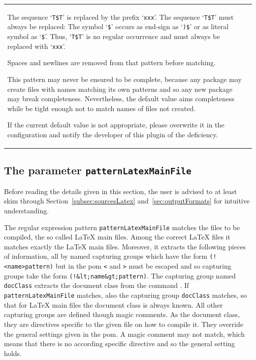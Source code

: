 \begin{longtable}{|ll|}
{\begin{minipage}{0.95\linewidth}
The sequence `\texttt{T\$T}' 
is replaced by the prefix `\texttt{xxx}'. 
The sequence `\texttt{T\$T}' must always be replaced: 
The symbol `\texttt{\$}' occurs as end-sign as `\texttt{)\$}' %
or as literal symbol as `\texttt{\$}'. 
Thus, `\texttt{T\$T}' is no regular occurrence 
and must always be replaced with `\texttt{xxx}'. 
		 
Spaces and newlines are removed 
from that pattern before matching. 

This pattern may never be ensured to be complete, 
because any package 
may create files with names matching its own patterns 
and so any new package may break completeness. 
Nevertheless, the default value aims completeness 
while be tight enough not to match names of files not created. 

If the current default value is not appropriate, 
please overwrite it in the configuration 
and notify the developer of this plugin of the deficiency. 
\end{minipage}
} \\ %
\end{longtable}


\subsection{The parameter \texttt{patternLatexMainFile}}%
\label{subsec:patternLatexMainFile}

Before reading the details given in this section, 
the user is advised to at least skim 
through Section~\ref{subsec:sourcesLatex} and~\ref{sec:outputFormats} 
for intuitive understanding. 

The regular expression pattern \texttt{patternLatexMainFile} 
matches the files to be compiled, the so called \LaTeX{} main files. 
Among the correct \LaTeX{} files it matches exactly the \LaTeX{} main files. 
Moreover, it extracts the following pieces of information, 
all by named capturing groups which have the form \texttt{(!<name>pattern)} 
but in the pom \texttt{<} and \texttt{>} must be escaped 
and so capturing groups take the form \texttt{(!\&lt;name\&gt;pattern)}. 
The capturing group named \texttt{docClass} extracts the document class 
from the command . 
If \texttt{patternLatexMainFile} matches, 
also the capturing group \texttt{docClass} matches, 
so that for \LaTeX{} main files the document class is always known. 
All other capturing groups are defined though magic comments. 
As the document class, they are directives specific to the given file 
on how to compile it. 
They override the general settings given in the pom. 
A magic comment may not match, 
which means that there is no according specific directive 
and so the general setting holds. 

